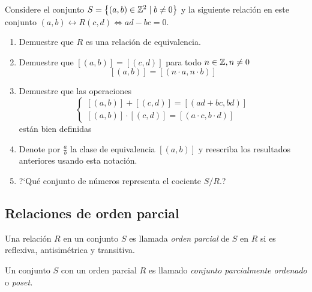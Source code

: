 \begin{exmp}
Considere el conjunto $S=\left\{ (a,b)\in \mathbb{Z}^{2}\mid b\neq0 \right\}$ y la siguiente relaci\'on en este conjunto
$
(a,b)\rel{R}(c,d) \iff ad-bc=0.
$
\end{exmp}
\begin{enumerate}
\item Demuestre que $R$ es una relaci\'on de equivalencia.
\item Demuestre que $[(a,b)]=[(c,d)]$ para todo $n\in\mathbb{Z}, n \neq 0$
$$
[(a,b)]=[(n\cdot a, n\cdot b)]
$$
\item Demuestre que las operaciones
$$
\begin{cases}
[(a,b)]+[(c,d)]=[(ad+bc,bd)] \\
[(a,b)]\cdot[(c,d)]=[(a\cdot c, b \cdot d)]
\end{cases}
$$ est\'an bien definidas
\item Denote por $\frac{a}{b}$ la clase de equivalencia $[(a,b)]$ y reescriba los resultados anteriores usando esta notaci\'on.
\item ?`Qu\'e conjunto de n\'umeros representa el cociente $S/R.$?
\end{enumerate}



\subsection{Relaciones de orden parcial}


	Una relaci\'on $R$ en un conjunto $S$ es llamada \emph{orden parcial} de $S$ en $R$ si es reflexiva, antisim\'etrica y transitiva. 
	
	Un conjunto $S$ con un orden parcial $R$ es llamado \emph{conjunto parcialmente ordenado} o \emph{poset.}



